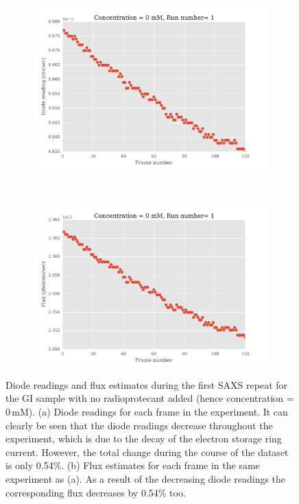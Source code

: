 \begin{figure}
    \centering
    \begin{subfigure}[b]{1.0\textwidth}
            \centering
            \includegraphics[width=\textwidth]{figures/saxs/np_diode_readings.pdf}
            \caption{}
            \label{fig:Diode readings}
    \end{subfigure}
    \\
    \begin{subfigure}[b]{1.0\textwidth}
            \centering
            \includegraphics[width=\textwidth]{figures/saxs/np_flux_estimates.pdf}
            \caption{}
            \label{fig:Flux estimates}
    \end{subfigure}
    \caption[Diode readings and flux estimates during the first SAXS repeat for the 1\,mg/ml GI sample with no radioprotecant added.]{Diode readings and flux estimates during the first SAXS repeat for the GI sample with no radioprotecant added (hence concentration = 0\,mM).
    (a) Diode readings for each frame in the experiment.
    It can clearly be seen that the diode readings decrease throughout the experiment, which is due to the decay of the electron storage ring current.
    However, the total change during the course of the dataset is only 0.54\%.
    (b) Flux estimates for each frame in the same experiment as (a).
    As a result of the decreasing diode readings the corresponding flux decreases by 0.54\% too.}
    \label{fig:Diode and flux readings}
\end{figure}

